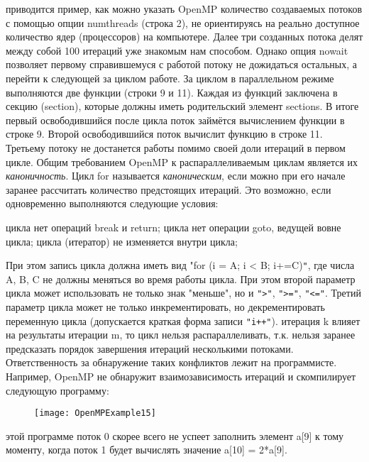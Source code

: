 {	 приводится пример, как можно указать OpenMP количество создаваемых потоков с помощью опции num\textunderscore threads (строка 2), не ориентируясь на реально доступное количество ядер (процессоров) на компьютере. Далее три созданных потока делят между собой 100 итераций уже знакомым нам способом. Однако опция nowait позволяет первому справившемуся с работой потоку не дожидаться остальных, а перейти к следующей за циклом работе. За циклом в параллельном режиме выполняются две функции (строки 9 и 11). Каждая из функций заключена в секцию (section), которые должны иметь родительский элемент sections. В итоге первый освободившийся после цикла поток займётся вычислением функции в строке 9. Второй освободившийся поток вычислит функцию в строке 11. Третьему потоку не достанется работы помимо своей доли итераций в первом цикле.
Общим требованием OpenMP к распараллеливаемым циклам является их \textit{каноничность}. Цикл for называется \textit{каноническим}, если можно при его начале заранее рассчитать количество предстоящих итераций. Это возможно, если одновременно выполняются следующие условия:
	\begin{itemize}
		 цикла нет операций break и return;
		 цикла нет операции goto, ведущей вовне цикла;
		 цикла (итератор) не изменяется внутри цикла;
	\end{itemize}
	При этом запись цикла должна иметь вид "for (i = A; i < B; i+=C)\verb+"+, где числа A, B, C не должны меняться во время работы цикла. При этом второй параметр цикла может использовать не только знак "меньше", но и  \verb+">"+,  \verb+">="+,  \verb+"<="+. Третий параметр цикла может не только инкрементировать, но декрементировать переменную цикла (допускается краткая форма записи   \verb|"i++"|).
	 итерация k влияет на результаты итерации m, то цикл нельзя распараллеливать, т.к. нельзя заранее предсказать порядок завершения итераций несколькими потоками.  Ответственность за обнаружение таких конфликтов лежит на программисте. Например, OpenMP не обнаружит взаимозависимость итераций и скомпилирует следующую программу:
	\begin{figure}[H]
		\texttt{[image: OpenMPExample15]}
	\end{figure}
	 этой программе поток 0 скорее всего не успеет заполнить элемент a[9] к тому моменту, когда поток 1 будет вычислять значение a[10] = 2*a[9].
	\par
}